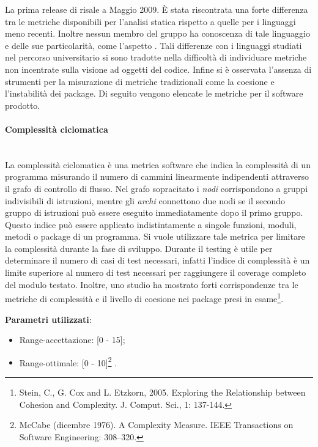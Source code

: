 		La prima release di  risale a Maggio 2009. È stata riscontrata una forte differenza tra le metriche disponibili per l'analisi statica rispetto a quelle per i linguaggi meno recenti. Inoltre nessun membro del gruppo ha conoscenza di tale linguaggio e delle sue particolarità, come l'aspetto . Tali differenze con i linguaggi studiati nel percorso universitario si sono tradotte nella difficoltà di individuare metriche non incentrate sulla visione ad oggetti del codice. Infine si è osservata l'assenza di strumenti per la misurazione di metriche tradizionali come la coesione e l'instabilità dei package.
		Di seguito vengono elencate le metriche per il software prodotto.
		
			\paragraph{Complessità ciclomatica}\mbox{} \\
				
			La complessità ciclomatica è una metrica software che indica la complessità di un programma misurando il numero di cammini linearmente indipendenti attraverso il grafo di controllo di flusso. Nel grafo sopracitato i \emph{nodi} corrispondono a gruppi indivisibili di istruzioni, mentre gli \emph{archi} connettono due nodi se il secondo gruppo di istruzioni può essere eseguito immediatamente dopo il primo gruppo.
			Questo indice può essere applicato indistintamente a singole funzioni, moduli, metodi o package di un programma.
			Si vuole utilizzare tale metrica per limitare la complessità durante la fase di sviluppo.
			Durante il testing è utile per determinare il numero di casi di test necessari, infatti l'indice di complessità è un limite superiore al numero di test necessari per raggiungere il coverage completo del modulo testato. Inoltre, uno studio ha mostrato forti corrispondenze tra le metriche di complessità e il livello di coesione nei package presi in esame\footnote{Stein, C., G. Cox and L. Etzkorn, 2005. Exploring the Relationship between Cohesion and Complexity. J. Comput. Sci., 1: 137-144.}.
			
			\textbf{Parametri utilizzati}:
			\begin{itemize}
				\item Range-accettazione: [0 - 15];
				\item Range-ottimale: [0 - 10]\footnote{McCabe (dicembre 1976). A Complexity Measure. IEEE Transactions on Software Engineering: 308–320.} .
			\end{itemize}


